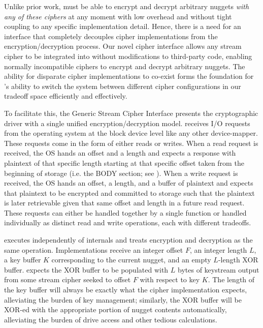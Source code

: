 
Unlike prior work, \sys must be able to encrypt and decrypt arbitrary nuggets
\emph{with any of these ciphers} at any moment with low overhead and without
tight coupling to any specific implementation detail. Hence, there is a need for
an interface that completely decouples cipher implementations from the
encryption/decryption process. Our novel cipher interface allows any stream
cipher to be integrated into \sys without modifications to third-party code,
enabling normally incompatible ciphers to encrypt and decrypt arbitrary nuggets.
The ability for disparate cipher implementations to co-exist forms the
foundation for \sys's ability to switch the system between different cipher
configurations in our tradeoff space efficiently and effectively.

To facilitate this, the Generic Stream Cipher Interface presents the
cryptographic driver with a single unified encryption/decryption model. \sys
receives I/O requests from the operating system at the block device level like
any other device-mapper. These requests come in the form of either reads or
writes. When a read request is received, the OS hands \sys an offset and a
length and expects a response with plaintext of that specific length starting at
that specific offset taken from the beginning of storage (i.e. the BODY section;
see ). When a write request is received, the OS hands \sys an
offset, a length, and a buffer of plaintext and expects that plaintext to be
encrypted and committed to storage such that the plaintext is later retrievable
given that same offset and length in a future read request. These requests can
either be handled together by a single function or handled individually as
distinct read and write operations, each with different tradeoffs.


 executes independently of \sys internals and
treats encryption and decryption as the same operation. Implementations receive
an integer offset $F$, an integer length $L$, a key buffer $K$ corresponding to
the current nugget, and an empty $L$-length XOR buffer. \sys expects the XOR
buffer to be populated with $L$ bytes of keystream output from some stream
cipher seeked to offset $F$ with respect to key $K$. The length of the key
buffer will always be exactly what the cipher implementation expects,
alleviating the burden of key management; similarly, the XOR buffer will be
XOR-ed with the appropriate portion of nugget contents automatically,
alleviating the burden of drive access and other tedious calculations.

